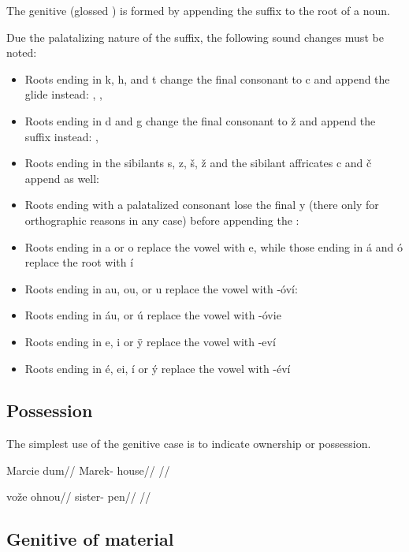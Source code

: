 The genitive (glossed ) is formed by appending the suffix  to the root of a noun.

Due the palatalizing nature of the suffix, the following sound changes must be noted:

\begin{itemize}
	\item Roots ending in k, h, and t change the final consonant to c and append the glide  instead:  ,  ,  
	\item Roots ending in d and g change the final consonant to \v{z} and append the suffix  instead:  ,  
	\item Roots ending in the sibilants s, z, \v{s}, \v{z} and the sibilant affricates c and \v{c} append  as well:
	\item Roots ending with a palatalized consonant lose the final y (there only for orthographic reasons in any case) before appending the : 
	\item Roots ending in a or o replace the vowel with e, while those ending in \'a and \'o replace the root with \'i
	\item Roots ending in au, ou, or u replace the vowel with -\'ov\'i:  
	\item Roots ending in \'au, or \'u replace the vowel with -\'ovie
	\item Roots ending in e, i or \"y replace the vowel with -ev\'i
	\item Roots ending in \'e, ei, \'i or \'y replace the vowel with -\'ev\'i
\end{itemize}


\subsection{Possession}
The simplest use of the genitive case is to indicate ownership or possession.

\pex
\begingl
\gla Marcie dum//
\glb Marek- house//
\glft {}//
\endgl
\xe

\pex
\begingl
\gla vo\v{z}e ohnou//
\glb sister- pen//
\glft {}//
\endgl
\xe

\subsection{Genitive of material}

